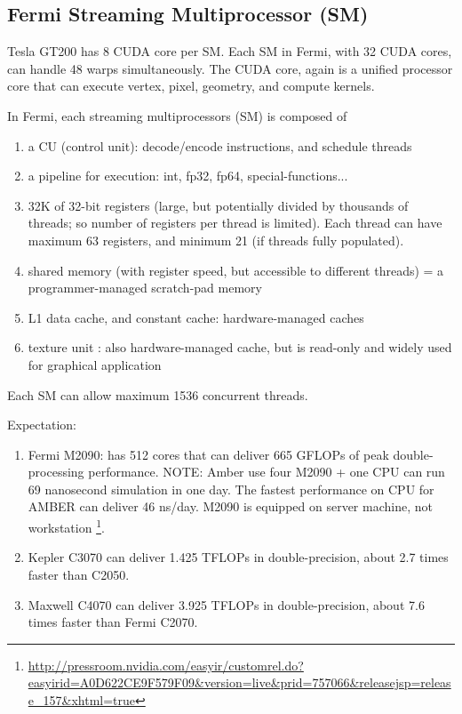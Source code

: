 
\subsection{Fermi Streaming Multiprocessor (SM)}
\label{sec:fermi-sm}

Tesla GT200 has 8 CUDA core per SM. Each SM in Fermi, with 32 CUDA cores, can
handle 48 warps simultaneously. The CUDA core, again is a unified processor core
that can execute vertex, pixel, geometry, and compute kernels.

In Fermi, each streaming multiprocessors (SM) is composed of
\begin{enumerate}
\item a CU (control unit): decode/encode instructions, and schedule threads
\item a pipeline for execution: int, fp32, fp64, special-functions...
\item 32K of 32-bit registers (large, but potentially divided by
  thousands of threads; so number of registers per thread is
  limited). Each thread can have maximum 63 registers, and minimum 21
  (if threads fully populated).
\item shared memory (with register speed, but accessible to different
  threads) = a programmer-managed scratch-pad memory
\item L1 data cache, and constant cache: hardware-managed caches
\item texture unit : also hardware-managed cache, but is read-only and
  widely used for graphical application
\end{enumerate}

Each SM can allow maximum 1536 concurrent threads. 

Expectation:
\begin{enumerate}
 \item Fermi M2090: has 512 cores that can deliver 665 GFLOPs of peak
  double-processing performance. NOTE: Amber use four M2090 + one CPU can run
  69 nanosecond simulation in one day. The fastest performance on CPU for AMBER
  can deliver 46 ns/day. M2090 is equipped on server machine, not workstation
  \footnote{\url{http://pressroom.nvidia.com/easyir/customrel.do?easyirid=A0D622CE9F579F09&version=live&prid=757066&releasejsp=release_157&xhtml=true}}.
 
 \item Kepler C3070 can deliver 1.425 TFLOPs in double-precision, about 2.7
 times faster than C2050. 
 
 \item Maxwell C4070 can deliver 3.925 TFLOPs in double-precision, about 7.6
 times faster than Fermi C2070. 
\end{enumerate}

